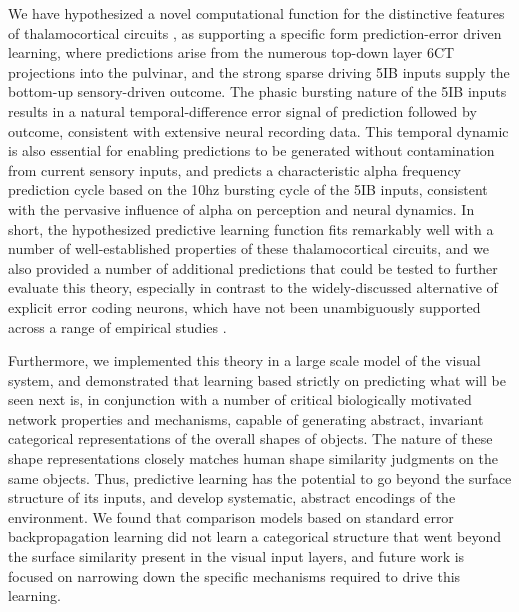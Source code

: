 \documentclass[11pt,twoside]{article}
\newif\myifpdf
\begin{document}
We have hypothesized a novel computational function for the distinctive features of thalamocortical circuits \citep{ShermanGuillery06}, as supporting a specific form prediction-error driven learning, where predictions arise from the numerous top-down layer 6CT projections into the pulvinar, and the strong sparse driving 5IB inputs supply the bottom-up sensory-driven outcome.  The phasic bursting nature of the 5IB inputs results in a natural temporal-difference error signal of prediction followed by outcome, consistent with extensive neural recording data.  This temporal dynamic is also essential for enabling predictions to be generated without contamination from current sensory inputs, and predicts a characteristic alpha frequency prediction cycle based on the 10hz bursting cycle of the 5IB inputs, consistent with the pervasive influence of alpha on perception and neural dynamics.  In short, the hypothesized predictive learning function fits remarkably well with a number of well-established properties of these thalamocortical circuits, and we also provided a number of additional predictions that could be tested to further evaluate this theory, especially in contrast to the widely-discussed alternative of explicit error coding neurons, which have not been unambiguously supported across a range of empirical studies \citep{WalshMcGovernClarkEtAl20}.

Furthermore, we implemented this theory in a large scale model of the visual system, and demonstrated that learning based strictly on predicting what will be seen next is, in conjunction with a number of critical biologically motivated network properties and mechanisms, capable of generating abstract, invariant categorical representations of the overall shapes of objects.  The nature of these shape representations closely matches human shape similarity judgments on the same objects.  Thus, predictive learning has the potential to go beyond the surface structure of its inputs, and develop systematic, abstract encodings of the environment.   We found that comparison models based on standard error backpropagation learning did not learn a categorical structure that went beyond the surface similarity present in the visual input layers, and future work is focused on narrowing down the specific mechanisms required to drive this learning.

\end{document}
